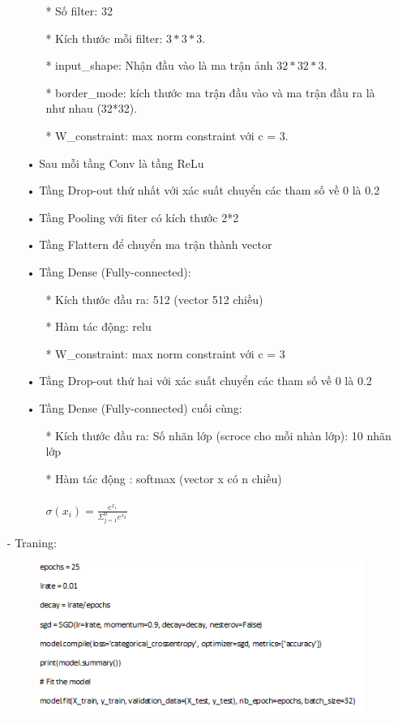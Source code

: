 \documentclass[a4paper,12pt]{report}
\begin{document}
\begin{itemize}
\begin{itemize}
\begin{itemize}
\item[*] Số filter: 32
\item[*] Kích thước mỗi filter: $3*3*3$.
\item[*] input\_shape: Nhận đầu vào là ma trận ảnh $32*32*3$.
\item[*] border\_mode: kích thước ma trận đầu vào và ma trận đầu ra là như nhau (32*32).
\item[*] W\_constraint: max norm constraint với c = 3.
\end{itemize}
\item[•] Sau mỗi tầng Conv là tầng ReLu
\item[•] Tầng Drop-out thứ nhất với xác suất chuyển các tham số về 0 là 0.2
\item[•] Tầng Pooling với fiter có kích thước 2*2
\item[•] Tầng Flattern để chuyển ma trận thành vector 
\item[•] Tầng Dense (Fully-connected):
\begin{itemize}
\item[*] Kích thước đầu ra: 512 (vector 512 chiều)
\item[*] Hàm tác động: relu
\item[*] W\_constraint:  max norm constraint với c = 3
\end{itemize}
\item[•] Tầng Drop-out thứ hai với xác suất chuyển các tham số về 0 là 0.2
\item[•] Tầng Dense (Fully-connected) cuối cùng:
\begin{itemize}
\item[*] Kích thước đầu ra: Số nhãn lớp (scroce cho mỗi nhàn lớp): 10 nhãn lớp
\item[*] Hàm tác động : softmax (vector x có n chiều) \\ \\ 
\hspace*{2cm} $\sigma(x_i) = \frac{e^{x_i}}{\Sigma_{j=1}^{n}e^{x_k}}$
\end{itemize}
\end{itemize}
\item[-] Traning:
\begin{figure}[h]
\begin{center}
\includegraphics[width =0.7 \textwidth]{code3.png}

\end{center}
\end{figure}
\end{itemize}
\end{document}
